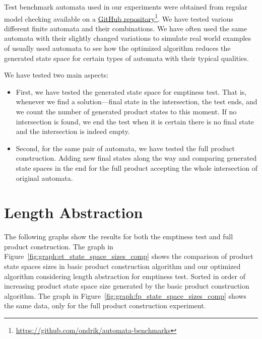 Test benchmark automata used in our experiments were obtained from regular model checking available on a \href{https://github.com/ondrik/automata-benchmarks/tree/master/nfa/non-vtf}{GitHub repository}\footnote{\url{https://github.com/ondrik/automata-benchmarks}}. We have tested various different finite automata and their combinations. We have often used the same automata with their slightly changed variations to simulate real world examples of usually used automata to see how the optimized algorithm reduces the generated state space for certain types of automata with their typical qualities.

We have tested two main aspects:
\begin{itemize}
    \item First, we have tested the generated state space for emptiness test. That is, whenever we find a solution---final state in the intersection, the test ends, and we count the number of generated product states to this moment. If no intersection is found, we end the test when it is certain there is no final state and the intersection is indeed empty.
    \item Second, for the same pair of automata, we have tested the full product construction. Adding new final states along the way and comparing generated state spaces in the end for the full product accepting the whole intersection of original automata.
\end{itemize}

\section{Length Abstraction}

The following graphs show the results for both the emptiness test and full product construction. The graph in Figure~\ref{fig:graph:et_state_space_sizes_comp} shows the comparison of product state spaces sizes in basic product construction algorithm and our optimized algorithm considering length abstraction for emptiness test. Sorted in order of increasing product state space size generated by the basic product construction algorithm. The graph in Figure~\ref{fig:graph:fp_state_space_sizes_comp} shows the same data, only for the full product construction experiment.

